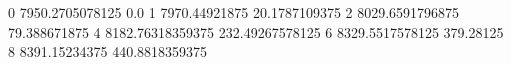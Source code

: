 0 7950.2705078125 0.0
1 7970.44921875 20.1787109375
2 8029.6591796875 79.388671875
4 8182.76318359375 232.49267578125
6 8329.5517578125 379.28125
8 8391.15234375 440.8818359375
